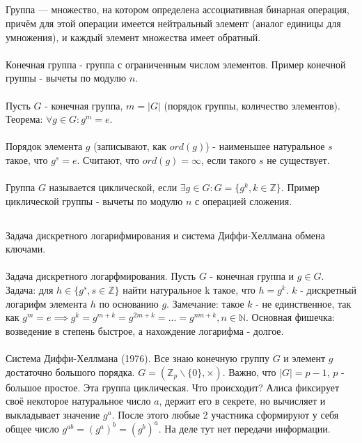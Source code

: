 \documentclass[a4paper,10pt]{article} %
\begin{document}
	\subsection{}
	Группа — множество, на котором определена ассоциативная бинарная операция, причём для этой операции имеется нейтральный элемент (аналог единицы для умножения), и каждый элемент множества имеет обратный.
	\\\\
	Конечная группа - группа с ограниченным числом элементов. Пример конечной группы - вычеты по модулю $n$.
	\\\\
	Пусть $G$ - конечная группа, $m = |G|$ (порядок группы, количество элементов).
	Теорема: $\forall g \in G: g^{m} = e$.
	\\\\
	Порядок элемента $g$ (записывают, как $ord(g)$) - наименьшее натуральное $s$ такое, что $g^{s} = e$. Считают, что $ord(g) = \infty$, если такого $s$ не существует.
	\\\\
	Группа $G$ называется циклической, если $\exists g \in G: G = \{g^{k}, k \in \mathbb{Z}\}$. Пример циклической группы - вычеты по модулю $n$ с операцией сложения.
	
	\subsection{}
	Задача дискретного логарифмирования и система Диффи-Хеллмана обмена ключами.
	\\\\
	Задача дискретного логарфмирования. Пусть $G$ - конечная группа и $g \in G$.
	Задача: для $h \in \{g^{s}, s \in \mathbb{Z}\}$ найти натуральное k такое, что
	$h = g^{k}$. $k$ - дискретный логарифм элемента $h$ по основанию $g$.
	Замечание: такое $k$ - не единственное, так как $g^{m} = e \implies 
	g^{k} = g^{m + k} = g^{2m + k} = ... = g^{nm + k}, n \in \mathbb{N}$.
	Основная фишечка: возведение в степень быстрое, а нахождение логарифма - долгое.
	\\\\
	Система Диффи-Хеллмана (1976). Все знаю конечную группу $G$ и элемент $g$ достаточно большого порядка. $G = (\mathbb{Z}_{p}\backslash\{0\}, \times)$. 
	Важно, что $|G| = p - 1$, $p$ - большое простое. Эта группа циклическая.
	Что происходит? Алиса фиксирует своё некоторое натуральное число $a$, держит его в секрете, но вычисляет и выкладывает значение $g^{a}$. После этого любые 2 участника сформируют у себя общее число $g^{ab} = (g^{a})^{b} = (g^{b})^{a}$.
	На деле тут нет передачи информации. 
\end{document}
